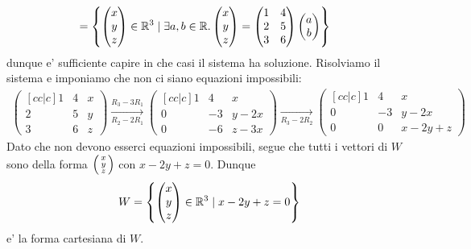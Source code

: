 \begin{example}
\begin{alignat*}{1}
            &= \left\{ \begin{pmatrix} x \\ y \\ z \end{pmatrix} \in \mathbb{R}^3 \mid \exists a, b \in \mathbb{R}. \begin{pmatrix} x \\ y \\ z \end{pmatrix} = \begin{pmatrix} 1 & 4 \\ 2&5 \\ 3&6 \end{pmatrix} \begin{pmatrix}a \\ b\end{pmatrix}\right\}
    \end{alignat*}
    dunque e' sufficiente capire in che casi il sistema ha soluzione.
    Risolviamo il sistema e imponiamo che non ci siano equazioni impossibili:
    \begin{gather*}
        \begin{pmatrix}[cc|c]
            1&4&x \\ 2&5&y \\ 3&6&z 
        \end{pmatrix} \xrightarrow[R_2 - 2R_1]{R_3 - 3R_1}
        \begin{pmatrix}[cc|c]
            1&4&x \\ 0&-3&y-2x \\ 0&-6&z-3x 
        \end{pmatrix} \xrightarrow[R_3 - 2R_2]{}
        \begin{pmatrix}[cc|c]
            1&4&x \\ 0&-3&y-2x \\ 0&0&x-2y+z 
        \end{pmatrix}
    \end{gather*}
    Dato che non devono esserci equazioni impossibili, segue che tutti i vettori di $W$ sono della forma $\begin{psmallmatrix}x\\y\\z\end{psmallmatrix}$ con $x - 2y + z = 0$. Dunque \[
        W = \left\{ \begin{pmatrix}
            x\\y\\z
        \end{pmatrix}\in \mathbb{R}^3 \mid x-2y+z = 0\right\}    
    \] e' la forma cartesiana di $W$.


\end{example}
